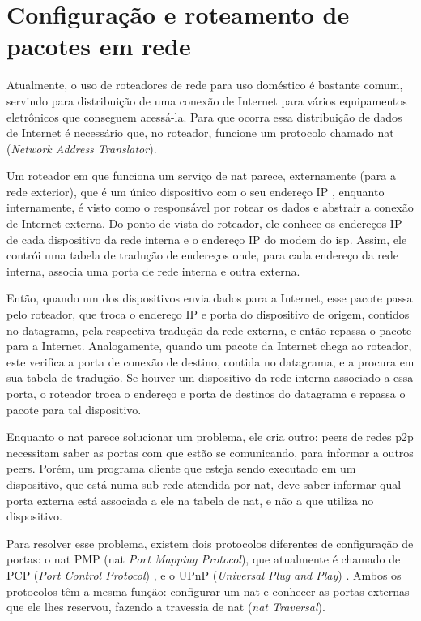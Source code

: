 
\section{Configuração e roteamento de pacotes em rede}

Atualmente, o uso de roteadores de rede para uso doméstico é bastante comum, servindo
para distribuição de uma conexão de Internet para vários equipamentos eletrônicos que
conseguem acessá-la. Para que ocorra essa distribuição de dados de Internet é
necessário que, no roteador, funcione um protocolo chamado \gls{nat}
(\emph{Network Address Translator}).

Um roteador em que funciona um serviço de \gls*{nat} parece, externamente (para a rede
exterior), que é um único dispositivo com o seu endereço IP \cite{book:kurose}, enquanto
internamente, é visto como o responsável por rotear os dados e abstrair a conexão de
Internet externa. Do ponto de vista do roteador, ele conhece os endereços IP de cada
dispositivo da rede interna e o endereço IP do modem do \gls{isp}. Assim, ele contrói
uma tabela de tradução de endereços onde, para cada endereço da rede interna, associa
uma porta de rede interna e outra externa.

Então, quando um dos dispositivos envia dados para a Internet, esse pacote passa pelo
roteador, que troca o endereço IP e porta do dispositivo de origem, contidos no
datagrama, pela respectiva tradução da rede externa, e então repassa o pacote para a
Internet. Analogamente, quando um pacote da Internet chega ao roteador, este verifica a
porta de conexão de destino, contida no datagrama, e a procura em sua tabela de
tradução. Se houver um dispositivo da rede interna associado a essa porta, o roteador
troca o endereço e porta de destinos do datagrama e repassa o pacote para tal
dispositivo.

Enquanto o \gls*{nat} parece solucionar um problema, ele cria outro: \glspl*{peer}
de redes \gls*{p2p} necessitam saber as portas com que estão se comunicando, para
informar a outros \glspl*{peer}. Porém, um programa cliente que esteja sendo executado
em um dispositivo, que está numa sub-rede atendida por \gls*{nat}, deve saber informar
qual porta externa está associada a ele na tabela de \gls*{nat}, e não a que utiliza
no dispositivo.

Para resolver esse problema, existem dois protocolos diferentes de configuração de
portas: o \gls*{nat} PMP (\gls*{nat} \emph{Port Mapping Protocol}), que atualmente é
chamado de PCP (\emph{Port Control Protocol}) \cite{site:rfcpcp}, e o UPnP
(\emph{Universal Plug and Play}) \cite{site:rfcupnp}. Ambos os protocolos têm a mesma
função: configurar um \gls*{nat} e conhecer as portas externas que ele lhes reservou,
fazendo a travessia de \gls*{nat} (\emph{\gls*{nat} Traversal}).

